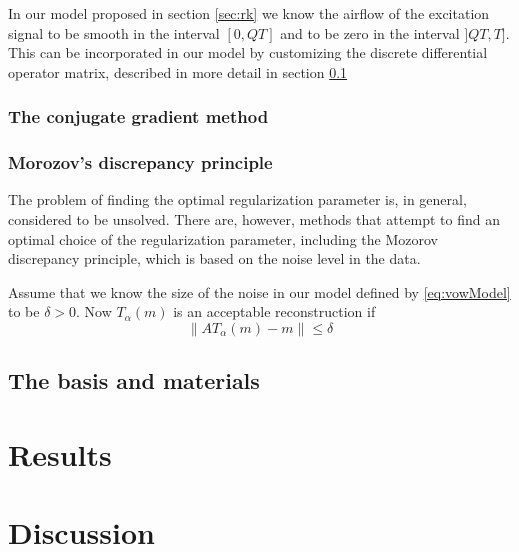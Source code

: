 \documentclass[12pt,a4]{article}
\newcommand{\lnorm}{\left\|}
\newcommand{\rnorm}{\right\|}
\begin{document}
In our model proposed in section \ref{sec:rk} we know the airflow of the excitation signal to be smooth in the interval $[0, QT]$ and to be zero in the interval $]QT, T]$. This can be incorporated in our model by customizing the discrete differential operator matrix, described in more detail in section \ref{sec:basis}


\subsubsection{The conjugate gradient method}\label{sec:conjgrad}


\subsubsection{Morozov's discrepancy principle}
The problem of finding the optimal regularization parameter is, in general, considered to be unsolved. There are, however, methods that attempt to find an optimal choice of the regularization parameter, including the Mozorov discrepancy principle, which is based on the noise level in the data.

Assume that we know the size of the noise in our model defined by \eqref{eq:vowModel} to be $\delta > 0$. Now $T_\alpha(m)$ is an acceptable reconstruction if 
\begin{equation}
\lnorm AT_\alpha(m)-m\rnorm \leq \delta
\end{equation}

\subsection{The basis and materials}\label{sec:basis}
\section{Results}\label{sec:results}


\section{Discussion}\label{sec:discussion}
\end{document}
